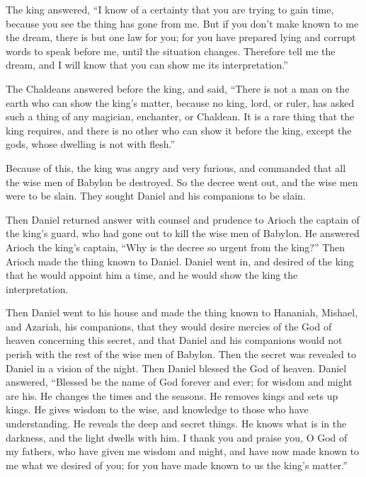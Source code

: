 The king answered, ``I know of a certainty that you are
trying to gain time, because you see the thing has gone from me.
 But if you don't make known to me the dream, there is but
one law for you; for you have prepared lying and corrupt words to speak
before me, until the situation changes. Therefore tell me the dream, and
I will know that you can show me its interpretation.''

 The Chaldeans answered before the king, and said,
``There is not a man on the earth who can show the king's matter,
because no king, lord, or ruler, has asked such a thing of any magician,
enchanter, or Chaldean.  It is a rare thing that the king
requires, and there is no other who can show it before the king, except
the gods, whose dwelling is not with flesh.''

 Because of this, the king was angry and very furious,
and commanded that all the wise men of Babylon be destroyed.
 So the decree went out, and the wise men were to be
slain. They sought Daniel and his companions to be slain.

 Then Daniel returned answer with counsel and prudence to
Arioch the captain of the king's guard, who had gone out to kill the
wise men of Babylon.  He answered Arioch the king's
captain, ``Why is the decree so urgent from the king?'' Then Arioch made
the thing known to Daniel.  Daniel went in, and desired
of the king that he would appoint him a time, and he would show the king
the interpretation.

 Then Daniel went to his house and made the thing known
to Hananiah, Mishael, and Azariah, his companions,  that
they would desire mercies of the God of heaven concerning this secret,
and that Daniel and his companions would not perish with the rest of the
wise men of Babylon.  Then the secret was revealed to
Daniel in a vision of the night. Then Daniel blessed the God of heaven.
 Daniel answered, ``Blessed be the name of God forever
and ever; for wisdom and might are his.  He changes the
times and the seasons. He removes kings and sets up kings. He gives
wisdom to the wise, and knowledge to those who have understanding.
 He reveals the deep and secret things. He knows what is
in the darkness, and the light dwells with him.  I thank
you and praise you, O God of my fathers, who have given me wisdom and
might, and have now made known to me what we desired of you; for you
have made known to us the king's matter.''

